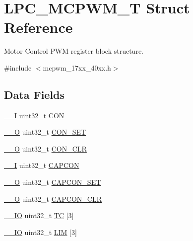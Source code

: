 \hypertarget{structLPC__MCPWM__T}{\section{L\-P\-C\-\_\-\-M\-C\-P\-W\-M\-\_\-\-T Struct Reference}
\label{structLPC__MCPWM__T}
}


Motor Control P\-W\-M register block structure.  




{\ttfamily \#include $<$mcpwm\-\_\-17xx\-\_\-40xx.\-h$>$}

\subsection*{Data Fields}
\begin{DoxyCompactItemize}
\item 
\hyperlink{core__cm3_8h_af63697ed9952cc71e1225efe205f6cd3}{\-\_\-\-\_\-\-I} uint32\-\_\-t \hyperlink{structLPC__MCPWM__T_ae047b5f0f2ca06bbaa663ce2458ae7ad}{C\-O\-N}
\item 
\hyperlink{core__cm3_8h_a7e25d9380f9ef903923964322e71f2f6}{\-\_\-\-\_\-\-O} uint32\-\_\-t \hyperlink{structLPC__MCPWM__T_a3dc36e144bb33d1756f06c765726f15d}{C\-O\-N\-\_\-\-S\-E\-T}
\item 
\hyperlink{core__cm3_8h_a7e25d9380f9ef903923964322e71f2f6}{\-\_\-\-\_\-\-O} uint32\-\_\-t \hyperlink{structLPC__MCPWM__T_a22b564b847caa28e9f0c53ff38375cc3}{C\-O\-N\-\_\-\-C\-L\-R}
\item 
\hyperlink{core__cm3_8h_af63697ed9952cc71e1225efe205f6cd3}{\-\_\-\-\_\-\-I} uint32\-\_\-t \hyperlink{structLPC__MCPWM__T_a47afe6c393cc7da61af1d48bfc0f709c}{C\-A\-P\-C\-O\-N}
\item 
\hyperlink{core__cm3_8h_a7e25d9380f9ef903923964322e71f2f6}{\-\_\-\-\_\-\-O} uint32\-\_\-t \hyperlink{structLPC__MCPWM__T_a8511a69d57549e1765080274f4bd5c3c}{C\-A\-P\-C\-O\-N\-\_\-\-S\-E\-T}
\item 
\hyperlink{core__cm3_8h_a7e25d9380f9ef903923964322e71f2f6}{\-\_\-\-\_\-\-O} uint32\-\_\-t \hyperlink{structLPC__MCPWM__T_aadd69d706d636d53ff8893d3a0be210a}{C\-A\-P\-C\-O\-N\-\_\-\-C\-L\-R}
\item 
\hyperlink{core__cm3_8h_aec43007d9998a0a0e01faede4133d6be}{\-\_\-\-\_\-\-I\-O} uint32\-\_\-t \hyperlink{structLPC__MCPWM__T_ae6960477ec37aa32fbb20956cf01edb7}{T\-C} \mbox{[}3\mbox{]}
\item 
\hyperlink{core__cm3_8h_aec43007d9998a0a0e01faede4133d6be}{\-\_\-\-\_\-\-I\-O} uint32\-\_\-t \hyperlink{structLPC__MCPWM__T_a01c2889381949b5b1f8c2bf8edf9148c}{L\-I\-M} \mbox{[}3\mbox{]}

\end{DoxyCompactItemize}
